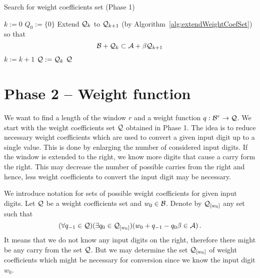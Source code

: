 \begin{algorithm}
  \caption{Search for weight coefficients set (Phase 1)}
    \label{alg:weightCoefSet}
  \begin{algorithmic}[1]
    \STATE $k:=0$ 
    \STATE $Q_0:=\{0\}$
    \REPEAT
     \STATE Extend $\mathcal{Q}_k$ to $\mathcal{Q}_{k+1}$ (by Algorithm~\ref{alg:extendWeightCoefSet}) so that $$\mathcal{B}+ \mathcal{Q}_k \subset \mathcal{A} + \beta \mathcal{Q}_{k+1}$$
     \vspace{-20pt}
      \STATE  $k:=k+1$
      \STATE $\mathcal{Q}:=\mathcal{Q}_k$
    \RETURN $\mathcal{Q}$
  \end{algorithmic}
\end{algorithm}




    

  
    
    





\section{Phase 2 -- Weight function}
\label{subsec:phase2}
    We want to find a length of the window $r$ and a weight function $q:\mathcal{B}^{r} \to \mathcal{Q}$. We start with the weight coefficients set $\mathcal{Q}$ obtained in Phase 1. The idea is to reduce necessary weight coefficients which are used to convert a given input digit up to a single value. This is done by enlarging the number of considered input digits.  If the window is extended to the right, we know more digits that cause a carry form the right. This may decrease the number of  possible carries from the right and hence, less weight coefficients to convert the input digit may be necessary.
     
    We introduce notation for sets of possible weight coefficients for given input digits.
        Let $\mathcal{Q}$ be a weight coefficients set and $w_0\in \mathcal{B}$. Denote by $\mathcal{Q}_{[w_0]}$ any set such that
        $$
            (\forall q_{-1} \in \mathcal{Q})(\exists q_0 \in \mathcal{Q}_{[w_0]})(w_0 + q_{-1} - q_0 \beta \in \mathcal{A})\,.
        $$
It means that we do not know any input digits on the right, therefore there might be any carry from the set $\mathcal{Q}$. But we may determine the set $\mathcal{Q}_{[w_0]}$ of  weight coefficients which might be necessary for conversion since we know the input digit $w_0$.
        
